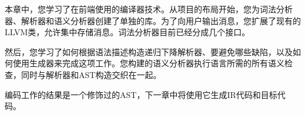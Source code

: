 本章中，您学习了在前端使用的编译器技术。从项目的布局开始，您为词法分析器、解析器和语义分析器创建了单独的库。为了向用户输出消息，您扩展了现有的LLVM类，允许集中存储消息。词法分析器目前已经分成几个接口。\par

然后，您学习了如何根据语法描述构造递归下降解析器、要避免哪些缺陷，以及如何使用生成器来完成这项工作。您构建的语义分析器执行语言所需的所有语义检查，同时与解析器和AST构造交织在一起。\par

编码工作的结果是一个修饰过的AST，下一章中将使用它生成IR代码和目标代码。\par

\newpage